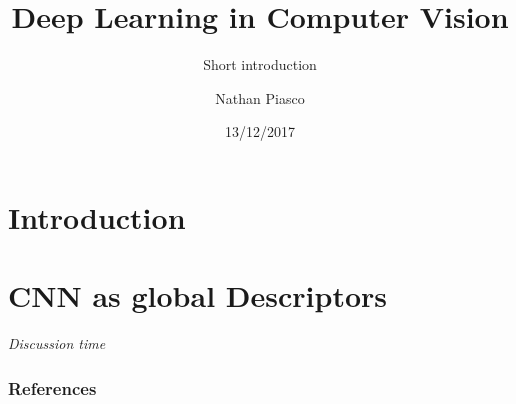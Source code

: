 \documentclass[9pt]{beamer}
\title[Deep Learning in Computer Vision]{Deep Learning in Computer Vision}
\subtitle{Short introduction}
\author{Nathan Piasco}
\institute{Le Creusot} %
\date{13/12/2017}
\begin{document}
\begin{frame}[plain,c]
	\titlepage
\end{frame}

\begin{frame}[plain,c]
	\tableofcontents
\end{frame}

\section{Introduction}

\section{CNN as global Descriptors}




\begin{frame}[plain,c]
\centering
\vfill
\huge{\textit{Discussion time}}
\vfill
\end{frame}



\begin{frame}
\frametitle{References}


\scriptsize{}

\end{frame}

 
\end{document}
